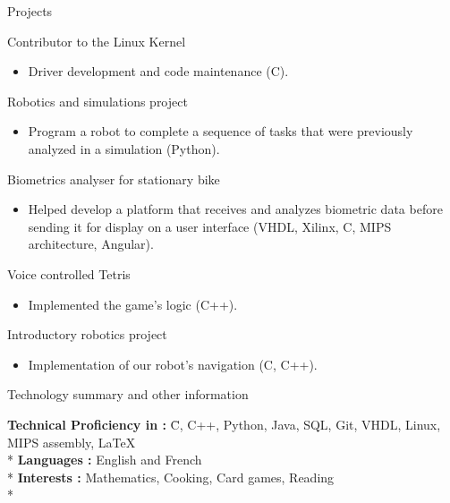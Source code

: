 \documentclass{article}
\newlength{\tabin}
\newlength{\secsep}
\newcommand{\lineunder}{\vspace*{-8pt} \\ \hspace*{-6pt} \hrulefill \\ \vspace*{-15pt}}
\newenvironment{tabbedsection}[1]{
  \begin{list}{}{
      \setlength{\itemsep}{0pt}
      \setlength{\labelsep}{0pt}
      \setlength{\labelwidth}{0pt}
      \setlength{\leftmargin}{\tabin}
      \setlength{\rightmargin}{\tabin}
      \setlength{\listparindent}{0pt}
      \setlength{\parsep}{0pt}
      \setlength{\parskip}{0pt}
      \setlength{\partopsep}{0pt}
      \setlength{\topsep}{#1}
    }
  \item[]
}{\end{list}}
\newenvironment{nospacetabbing}{
    \begin{tabbing}
}{\end{tabbing}\vspace{-1.2em}}
\newenvironment{resume_section}[1]{
  \filbreak
  \vspace{2\secsep}
  \textsc{\large#1}
  \lineunder
  \begin{tabbedsection}{\secsep}
}{\end{tabbedsection}}
\newenvironment{resume_subsection}[2][]{
  \textbf{#2} \hfill {\footnotesize #1} \hspace{2em}
  \begin{tabbedsection}{0.5\secsep}
}{\end{tabbedsection}}
\newenvironment{subitems}{
  \renewcommand{\labelitemi}{-}
  \begin{itemize}
      \setlength{\labelsep}{1em}
}{\end{itemize}}
\begin{document}
\begin{resume_section}{Projects}
  \begin{resume_subsection}[Fall 2019-]{Contributor to the Linux Kernel}
  \begin{subitems}
    \item Driver development and code maintenance (C).
    \end{subitems}
  \end{resume_subsection}
  
  \begin{resume_subsection}[Fall 2019]{Robotics and simulations project}
  \begin{subitems}
    \item Program a robot to complete a sequence of tasks that were previously analyzed in a simulation (Python).
    \end{subitems}
  \end{resume_subsection}
  
  \begin{resume_subsection}[Winter 2019]{Biometrics analyser for stationary bike}
  \begin{subitems}
    \item Helped develop a platform that receives and analyzes biometric data before sending it for display on a user interface (VHDL, Xilinx, C, MIPS architecture, Angular).
    \end{subitems}
  \end{resume_subsection}
  
  \begin{resume_subsection}[Winter 2018]{Voice controlled Tetris}
    \begin{subitems}
        \item Implemented the game's logic (C++).
    \end{subitems}
  \end{resume_subsection}
  
  \begin{resume_subsection}[Fall 2017]{Introductory robotics project}
    \begin{subitems}
    \item Implementation of our robot's navigation (C, C++).
    \end{subitems}
  \end{resume_subsection}
\end{resume_section}

\begin{resume_section}{Technology summary and other information}
  \begin{nospacetabbing}

  \textbf{Technical Proficiency in : }  \= C, C++, Python, Java, SQL, Git, VHDL, Linux, MIPS assembly,  \LaTeX\\*
  \textbf{Languages : } \> English and French\\*
  \textbf{Interests : } \> Mathematics, Cooking, Card games, Reading\\*
  \end{nospacetabbing}
\end{resume_section}
\end{document}
